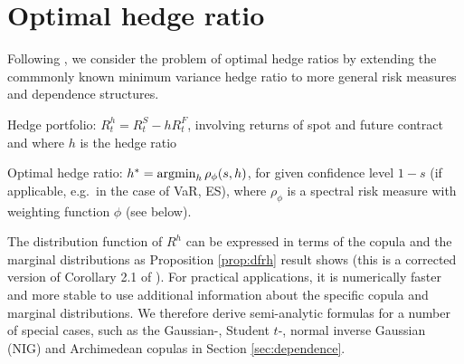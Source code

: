 \section{Optimal hedge ratio}
\label{sec:optimal-hedge-ratio}

Following \citep{Barbi2014}, we consider the problem of optimal
hedge ratios by extending the commmonly known minimum variance hedge
ratio to more general risk measures and dependence
structures.\medskip

Hedge portfolio: $R_t^h = R_t^S - h R_t^F$, involving returns of spot
and future contract and where $h$ is the hedge ratio

Optimal hedge ratio: $h^\ast = \argmin_h \rho_\phi(s,h)$, for given
confidence level $1-s$ (if applicable, e.g.\ in the case of VaR, ES),
where $\rho_\phi$ is a spectral risk measure with weighting function
$\phi$ (see below).

The distribution function of $R^h$ can be expressed in terms of the
copula and the marginal distributions as Proposition \ref{prop:dfrh}
result shows (this is a corrected version of Corollary 2.1 of
\citep{Barbi2014}). For practical applications, it is numerically
faster and more stable to use additional information about the
specific copula and marginal distributions. We therefore derive
semi-analytic formulas for a number of special cases, such as the
Gaussian-, Student $t$-, normal inverse Gaussian (NIG) and Archimedean
copulas in Section \ref{sec:dependence}.

